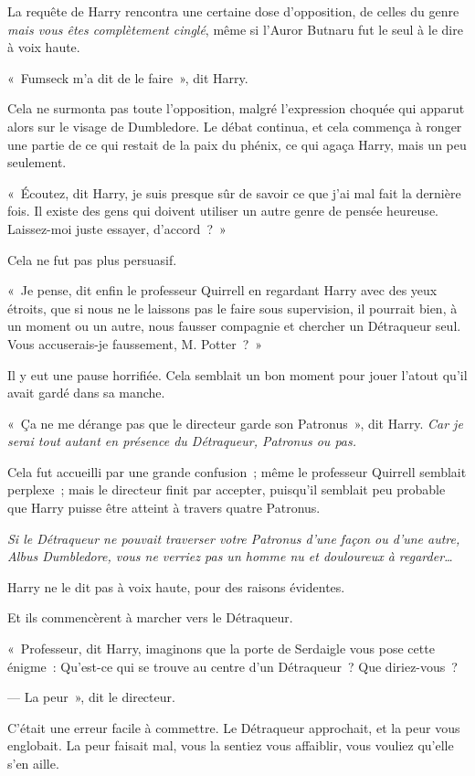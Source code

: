 \later

La requête de Harry rencontra une certaine dose d'opposition, de celles du genre \emph{mais vous êtes complètement cinglé}, même si l'Auror Butnaru fut le seul à le dire à voix haute.

«~Fumseck m'a dit de le faire~», dit Harry.

Cela ne surmonta pas toute l'opposition, malgré l'expression choquée qui apparut alors sur le visage de Dumbledore. Le débat continua, et cela commença à ronger une partie de ce qui restait de la paix du phénix, ce qui agaça Harry, mais un peu seulement.

«~Écoutez, dit Harry, je suis presque sûr de savoir ce que j'ai mal fait la dernière fois. Il existe des gens qui doivent utiliser un autre genre de pensée heureuse. Laissez-moi juste essayer, d'accord~?~»

Cela ne fut pas plus persuasif.

«~Je pense, dit enfin le professeur Quirrell en regardant Harry avec des yeux étroits, que si nous ne le laissons pas le faire sous supervision, il pourrait bien, à un moment ou un autre, nous fausser compagnie et chercher un Détraqueur seul. Vous accuserais-je faussement, M. Potter~?~»

Il y eut une pause horrifiée. Cela semblait un bon moment pour jouer l'atout qu'il avait gardé dans sa manche.

«~Ça ne me dérange pas que le directeur garde son Patronus~», dit Harry. \emph{Car je serai tout autant en présence du Détraqueur, Patronus ou pas.}

Cela fut accueilli par une grande confusion~; même le professeur Quirrell semblait perplexe~; mais le directeur finit par accepter, puisqu'il semblait peu probable que Harry puisse être atteint à travers quatre Patronus.

\emph{Si le Détraqueur ne pouvait traverser votre Patronus d'une façon ou d'une autre, Albus Dumbledore, vous ne verriez pas un homme nu et douloureux à regarder…}

Harry ne le dit pas à voix haute, pour des raisons évidentes.

Et ils commencèrent à marcher vers le Détraqueur.

«~Professeur, dit Harry, imaginons que la porte de Serdaigle vous pose cette énigme~: Qu'est-ce qui se trouve au centre d'un Détraqueur~? Que diriez-vous~?

--- La peur~», dit le directeur.

C'était une erreur facile à commettre. Le Détraqueur approchait, et la peur vous englobait. La peur faisait mal, vous la sentiez vous affaiblir, vous vouliez qu'elle s'en aille.

